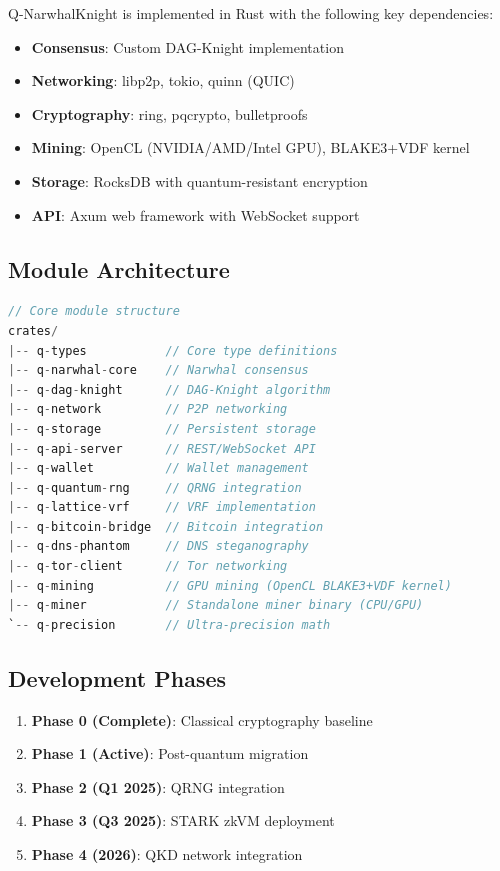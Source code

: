 \documentclass[11pt,a4paper]{article}
\begin{document}
Q-NarwhalKnight is implemented in Rust with the following key dependencies:
\begin{itemize}
    \item \textbf{Consensus}: Custom DAG-Knight implementation
    \item \textbf{Networking}: libp2p, tokio, quinn (QUIC)
    \item \textbf{Cryptography}: ring, pqcrypto, bulletproofs
    \item \textbf{Mining}: OpenCL (NVIDIA/AMD/Intel GPU), BLAKE3+VDF kernel
    \item \textbf{Storage}: RocksDB with quantum-resistant encryption
    \item \textbf{API}: Axum web framework with WebSocket support
\end{itemize}

\subsection{Module Architecture}

\begin{lstlisting}[language=Rust]
// Core module structure
crates/
|-- q-types           // Core type definitions
|-- q-narwhal-core    // Narwhal consensus
|-- q-dag-knight      // DAG-Knight algorithm
|-- q-network         // P2P networking
|-- q-storage         // Persistent storage
|-- q-api-server      // REST/WebSocket API
|-- q-wallet          // Wallet management
|-- q-quantum-rng     // QRNG integration
|-- q-lattice-vrf     // VRF implementation
|-- q-bitcoin-bridge  // Bitcoin integration
|-- q-dns-phantom     // DNS steganography
|-- q-tor-client      // Tor networking
|-- q-mining          // GPU mining (OpenCL BLAKE3+VDF kernel)
|-- q-miner           // Standalone miner binary (CPU/GPU)
`-- q-precision       // Ultra-precision math
\end{lstlisting}

\subsection{Development Phases}

\begin{enumerate}
    \item \textbf{Phase 0 (Complete)}: Classical cryptography baseline
    \item \textbf{Phase 1 (Active)}: Post-quantum migration
    \item \textbf{Phase 2 (Q1 2025)}: QRNG integration
    \item \textbf{Phase 3 (Q3 2025)}: STARK zkVM deployment
    \item \textbf{Phase 4 (2026)}: QKD network integration
\end{enumerate}
\end{document}
